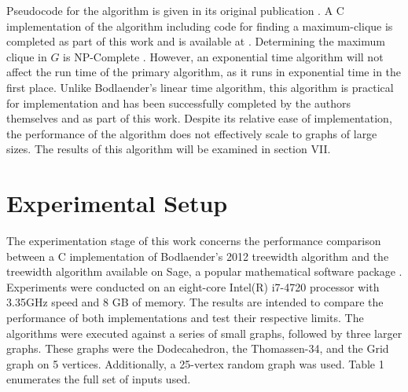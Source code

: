 \documentclass[12pt,conference]{IEEEtran}
\theoremstyle{plain}
\begin{document}
Pseudocode for the algorithm is given in its original publication \cite{bodlaender-2012}. A C implementation of the algorithm including code for finding a maximum-clique is completed as part of this work and is available at \cite{project-github}. Determining the maximum clique in $G$ is NP-Complete \cite{max-clique-npc}. However, an exponential time algorithm will not affect the run time of the primary algorithm, as it runs in exponential time in the first place. Unlike Bodlaender's linear time algorithm, this algorithm is practical for implementation and has been successfully completed by the authors themselves and as part of this work. Despite its relative ease of implementation, the performance of the algorithm does not effectively scale to graphs of large sizes. The results of this algorithm will be examined in section VII.

\section{Experimental Setup}

The experimentation stage of this work concerns the performance comparison between a C implementation of Bodlaender's 2012 treewidth algorithm and the treewidth algorithm available on Sage, a popular mathematical software package \cite{sage-original}. Experiments were conducted on an eight-core Intel(R) i7-4720 processor with 3.35GHz speed and 8 GB of memory. The results are intended to compare the performance of both implementations and test their respective limits. The algorithms were executed against a series of small graphs, followed by three larger graphs. These graphs were the Dodecahedron, the Thomassen-34, and the Grid graph on 5 vertices. Additionally, a 25-vertex random graph was used. Table 1 enumerates the full set of inputs used.
\end{document}
